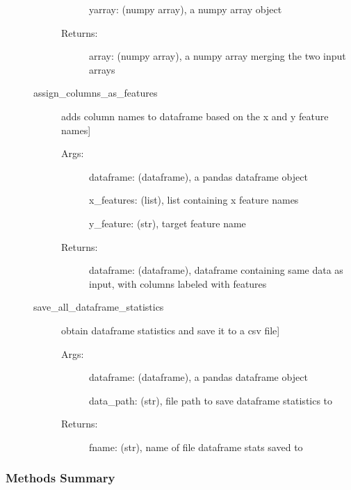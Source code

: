 \documentclass[letterpaper,10pt,english]{sphinxmanual}
\begin{document}
\begin{fulllineitems}
\begin{description}
\begin{description}
\begin{description}
yarray: (numpy array), a numpy array object

\item[{Returns:}] \leavevmode
array: (numpy array), a numpy array merging the two input arrays

\end{description}

\item[{assign\_columns\_as\_features}] \leavevmode{[}adds column names to dataframe based on the x and y feature names{]}\begin{description}
\item[{Args:}] \leavevmode
dataframe: (dataframe), a pandas dataframe object

x\_features: (list), list containing x feature names

y\_feature: (str), target feature name

\item[{Returns:}] \leavevmode
dataframe: (dataframe), dataframe containing same data as input, with columns labeled with features

\end{description}

\item[{save\_all\_dataframe\_statistics}] \leavevmode{[}obtain dataframe statistics and save it to a csv file{]}\begin{description}
\item[{Args:}] \leavevmode
dataframe: (dataframe), a pandas dataframe object

data\_path: (str), file path to save dataframe statistics to

\item[{Returns:}] \leavevmode
fname: (str), name of file dataframe stats saved to

\end{description}

\end{description}

\end{description}
\subsubsection*{Methods Summary}


\begin{savenotes}\sphinxatlongtablestart\begin{longtable}[c]{}
\hline

\endfirsthead


\end{longtable}
\end{savenotes}
\end{fulllineitems}
\end{document}
